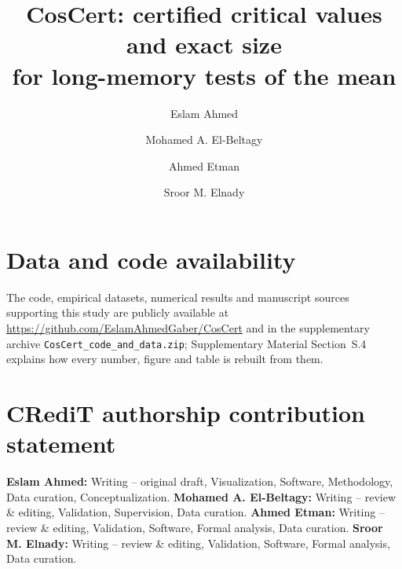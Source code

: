 \documentclass[final,3p,11pt]{elsarticle}
\theoremstyle{definition}
\newcommand{\CosCert}{CosCert}   %
\begin{document}
\begin{frontmatter}
\title{\CosCert: certified critical values and exact size\\ for long-memory tests of the mean}

\author[a]{Eslam Ahmed}
\author[a]{Mohamed A. El-Beltagy}
\author[a]{Ahmed Etman}
\author[b,c]{Sroor M. Elnady}

%
\end{frontmatter}

%
%
%
%
%
%
%
%
%

\section*{Data and code availability}
The code, empirical datasets, numerical results and manuscript sources supporting this study are publicly available at
\url{https://github.com/EslamAhmedGaber/CosCert} and in the supplementary archive
\texttt{CosCert\_\allowbreak code\_\allowbreak and\_\allowbreak data.zip}; Supplementary Material Section~S.4 explains
how every number, figure and table is rebuilt from them.

\section*{CRediT authorship contribution statement}
\textbf{Eslam Ahmed:} Writing -- original draft, Visualization, Software, Methodology, Data curation, Conceptualization.
\textbf{Mohamed A. El-Beltagy:} Writing -- review \& editing, Validation, Supervision, Data curation.
\textbf{Ahmed Etman:} Writing -- review \& editing, Validation, Software, Formal analysis, Data curation.
\textbf{Sroor M. Elnady:} Writing -- review \& editing, Validation, Software, Formal analysis, Data curation.
\end{document}
